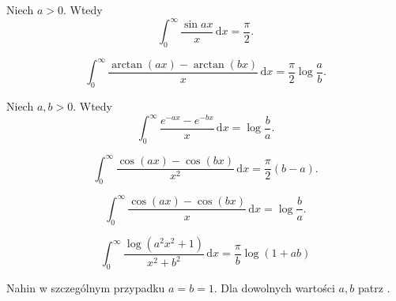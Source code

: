 \begin{problem}
    Niech $a > 0$.
    Wtedy
    \begin{equation}
        \int_0^\infty \frac{\sin ax}{x} \,\mathrm{d}x = \frac \pi 2.
    \end{equation}
\end{problem}

\begin{problem}
    \begin{equation}
        \int_0^\infty \frac{\arctan (ax) - \arctan (bx)}{x} \,\mathrm{d}x = \frac \pi 2 \log \frac a b.
    \end{equation}
\end{problem}

\begin{problem}
    Niech $a, b > 0$.
    Wtedy
    \begin{equation}
        \int_0^\infty \frac{e^{-ax} - e^{-bx}}{x} \,\mathrm{d}x = \log \frac b a.
    \end{equation}
\end{problem}

\begin{problem}
    \begin{equation}
        \int_0^\infty \frac{\cos (ax) - \cos (bx)}{x^2} \,\mathrm{d}x = \frac \pi 2 (b - a).
    \end{equation}
\end{problem}

\begin{problem}
    \begin{equation}
        \int_0^\infty \frac{\cos (ax) - \cos (bx)}{x} \,\mathrm{d}x = \log \frac b a.
    \end{equation}
\end{problem}

\begin{problem}
    \label{nahin_kriegsrecht}
    \begin{equation}
        \int_0^\infty \frac{\log (a^2 x^2 + 1)}{x^2 + b^2} \,\mathrm{d}x = \frac \pi b \log (1 + ab)
    \end{equation}
\end{problem}

\begin{solution} %
    Nahin \cite[s. 67]{nahin15} w szczególnym przypadku $a = b = 1$. %
    Dla dowolnych wartości $a, b$ patrz \cite[s. 114, 375]{nahin15}. %
\end{solution} %

